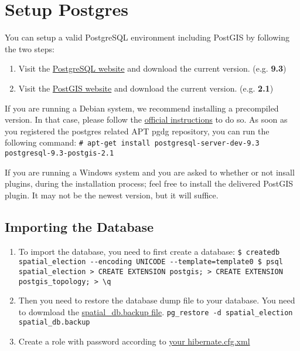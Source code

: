 
\section{Setup Postgres}

You can setup a valid PostgreSQL environment including PostGIS by
following the two steps:

\begin{enumerate}
\def\labelenumi{\arabic{enumi}.}
\item
  Visit the \href{http://www.postgresql.org/}{PostgreSQL website} and
  download the current version. (e.g. \textbf{9.3})
\item
  Visit the \href{http://postgis.net/}{PostGIS website} and download the
  current version. (e.g. \textbf{2.1})
\end{enumerate}

If you are running a Debian system, we recommend installing a
precompiled version. In that case, please follow the
\href{https://wiki.postgresql.org/wiki/Apt}{official instructions} to do
so. As soon as you registered the postgres related APT pgdg repository,
you can run the following command:
\texttt{\# apt-get install postgresql-server-dev-9.3 postgresql-9.3-postgis-2.1}

If you are running a Windows system and you are asked to whether or not
insall plugins, during the installation process; feel free to install
the delivered PostGIS plugin. It may not be the newest version, but it
will suffice.

\subsection{Importing the Database}\label{importing-the-database}

\begin{enumerate}
\def\labelenumi{\arabic{enumi}.}
\item
  To import the database, you need to first create a database:
  \texttt{\$ createdb spatial\_election -{}-encoding UNICODE -{}-template=template0    \$ psql spatial\_election    \textgreater{} CREATE EXTENSION postgis;    \textgreater{} CREATE EXTENSION postgis\_topology;    \textgreater{} \textbackslash{}q}
\item
  Then you need to restore the database dump file to your database. You
  need to dowmload the
  \href{https://github.com/a-d/spatial.election/raw/master/spatial.election.data/spatial_db.backup}{spatial\_db.backup
  file}. \texttt{pg\_restore -d spatial\_election spatial\_db.backup}
\item
  Create a role with password according to
  \href{https://github.com/a-d/spatial.election/blob/master/spatial.election.database/src/main/resources/hibernate.cfg.xml}{your
  hibernate.cfg.xml}
\end{enumerate}